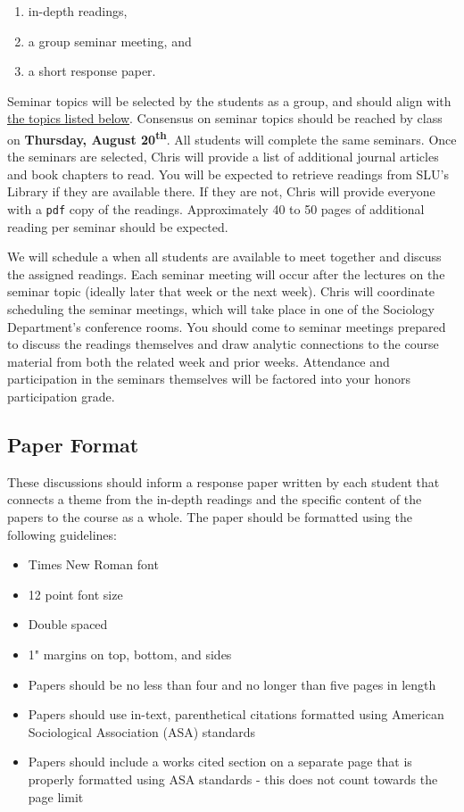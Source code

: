 \documentclass[
]{book}
\providecommand{\tightlist}{%
  \setlength{\itemsep}{0pt}\setlength{\parskip}{0pt}}
\begin{document}
\begin{enumerate}
\def\labelenumi{\arabic{enumi}.}
\tightlist
\item
  in-depth readings,
\item
  a group seminar meeting, and
\item
  a short response paper.
\end{enumerate}

Seminar topics will be selected by the students as a group, and should align with \href{/honors-seminar-topics.html}{the topics listed below}. Consensus on seminar topics should be reached by class on \textbf{Thursday, August 20\textsuperscript{th}}. All students will complete the same seminars. Once the seminars are selected, Chris will provide a list of additional journal articles and book chapters to read. You will be expected to retrieve readings from SLU's Library if they are available there. If they are not, Chris will provide everyone with a \texttt{pdf} copy of the readings. Approximately 40 to 50 pages of additional reading per seminar should be expected.

We will schedule a when all students are available to meet together and discuss the assigned readings. Each seminar meeting will occur after the lectures on the seminar topic (ideally later that week or the next week). Chris will coordinate scheduling the seminar meetings, which will take place in one of the Sociology Department's conference rooms. You should come to seminar meetings prepared to discuss the readings themselves and draw analytic connections to the course material from both the related week and prior weeks. Attendance and participation in the seminars themselves will be factored into your honors participation grade.

\hypertarget{paper-format}{%
\subsection{Paper Format}\label{paper-format}}

These discussions should inform a response paper written by each student that connects a theme from the in-depth readings and the specific content of the papers to the course as a whole. The paper should be formatted using the following guidelines:

\begin{itemize}
\tightlist
\item
  Times New Roman font
\item
  12 point font size
\item
  Double spaced
\item
  1" margins on top, bottom, and sides
\item
  Papers should be no less than four and no longer than five pages in length
\item
  Papers should use in-text, parenthetical citations formatted using American Sociological Association (ASA) standards
\item
  Papers should include a works cited section on a separate page that is properly formatted using ASA standards - this does not count towards the page limit
\end{itemize}
\end{document}
